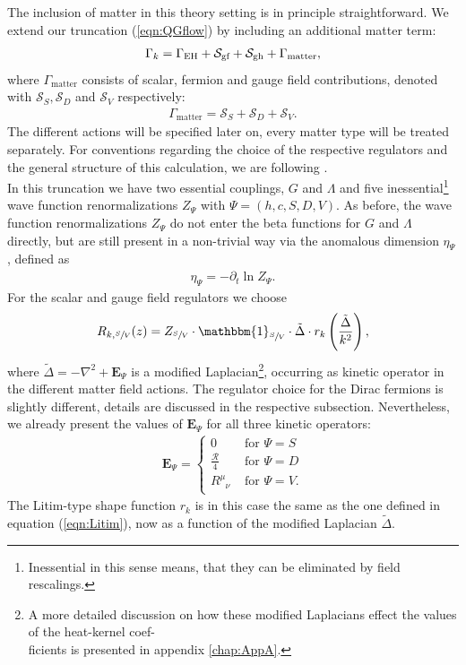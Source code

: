 The inclusion of matter in this theory setting is in principle straightforward. We extend our truncation (\ref{eqn:QGflow}) by including an additional matter term: 
\begin{align}
	\Gamma_{k} = \Gamma_{\text{EH}} + \mathcal{S}_{\text{gf}}+ \mathcal{S}_{\text{gh}}+ \Gamma_{\text{matter}},
\end{align}
where $\Gamma_{\mathrm{matter}}$ consists of scalar, fermion and gauge field contributions, denoted with $\mathcal{S}_S, \mathcal{S}_D$ and $\mathcal{S}_V$ respectively:
\begin{align}
	\Gamma_{\text{matter}} = \mathcal{S}_S + \mathcal{S}_D + \mathcal{S}_V.
\end{align}
The different actions will be specified later on, every matter type will be treated separately. For conventions regarding the choice of the respective regulators and the general structure of this calculation, we are following \cite{DonaEichhornPercacci2013}. \\
In this truncation we have two essential couplings, $G$ and $\Lambda$ and five inessential\footnote{Inessential in this sense means, that they can be eliminated by field rescalings.} wave function renormalizations $Z_{\Psi}$ with $\Psi = (h,c,S,D,V)$. As before, the wave function renormalizations $Z_{\Psi}$ do not enter the beta functions for $G$ and $\Lambda$ directly, but are still present in a non-trivial way via the anomalous dimension $\eta_{\Psi}$, defined as
\begin{align}
	\eta_{\Psi} = -\partial_t \ln Z_{\Psi}.
\end{align}
For the scalar and gauge field regulators we choose
\begin{align}
	R_{k,\sfrac{S}{V}}(z) = Z_{\sfrac{S}{V}} \cdot \mathbbm{1}_{\sfrac{S}{V}} \cdot \tilde{\Delta}\cdot r_k\left(\frac{\tilde{\Delta}}{k^2}\right),
	\label{eqn:Rk_matter}
\end{align}
where $\tilde{\Delta}= -\nabla^2 + \mathbf{E}_{\Psi}$ is a modified Laplacian\footnote{A more detailed discussion on how these modified Laplacians effect the values of the heat-kernel coef-\\ \phantom{........}ficients is presented in appendix \ref{chap:AppA}.}, occurring as kinetic operator in the different matter field actions. The regulator choice for the Dirac fermions is slightly different, details are discussed in the respective subsection. Nevertheless, we already present the values of $\mathbf{E}_{\Psi}$ for all three kinetic operators:
\begin{align}
	\mathbf{E}_{\Psi} =  \left\{\begin{array}{ll}{0} & {\text { for } \Psi = S} \\[5pt] {\frac{\mathcal{R}}{4}} & {\text { for } \Psi = D}\\[5pt]  {R^{\mu}_{\phantom{\mu}\nu}} & {\text { for } \Psi = V.}\end{array}\right.
\end{align}
The Litim-type shape function $r_k$ is in this case the same as the one defined in equation (\ref{eqn:Litim}), now as a function of the modified Laplacian $\tilde{\Delta}$.
